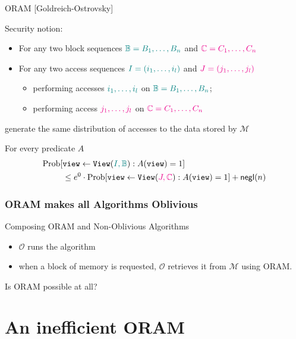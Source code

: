 \documentclass[]{beamer}
\newcommand{\owner}{\mathcal{O}}
\newcommand{\manager}{\mathcal{M}}
\begin{document}
{\begin{frame}[label=GO]
\begin{block}{ORAM [Goldreich-Ostrovsky]}
\begin{itemize}
{\color{olive}
\item Security notion:
\begin{itemize}
\color{olive}
\item For any two block sequences $\color{teal} \mathbb{B}=B_1,\ldots,B_n$ and 
                                    $\color{magenta} \mathbb{C}=C_1,\ldots,C_n$
\item For any two access sequences $\color{teal}   I=(i_1,\ldots,i_l)$ and 
                                   $\color{magenta}J=(j_1,\ldots,j_l)$
\begin{itemize}
\color{olive}
    \item performing accesses $\color{teal}    i_1,\ldots,i_l$ on
                $\color{teal} \mathbb{B}=B_1,\ldots,B_n$;
    \item performing access $\color{magenta} j_1,\ldots,j_l$ on
                $\color{magenta} \mathbb{C}=C_1,\ldots,C_n$
\end{itemize}
\end{itemize}
    generate the same distribution of accesses to the data stored by $\manager$
}
\end{itemize}
\end{block}
\pause
For every predicate $A$
\begin{align*}
\text{\rm Prob}[&\mathtt{view}\leftarrow\mathtt{View}({\color{teal}I,\mathbb{B}}):
    A(\mathtt{view})=1]\\ & \leq e^0\cdot
  \text{\rm Prob}[\mathtt{view}\leftarrow\mathtt{View}({\color{magenta}J,\mathbb{C}}):
    A(\mathtt{view})=1]+{\mathsf{negl}(n)}
\end{align*}
\end{frame}

\begin{frame}
\frametitle{ORAM makes all Algorithms Oblivious}
\begin{block}{Composing ORAM and Non-Oblivious Algorithms}

\begin{itemize}
\item $\owner$ runs the algorithm
\item when a block of memory is requested, $\owner$ retrieves it from $\manager$
using ORAM.
\end{itemize}
\end{block}
\pause
\vfill
\centerline{\alert{Is ORAM possible at all?}}
\end{frame}

\section{An inefficient ORAM}

}
\end{document}
